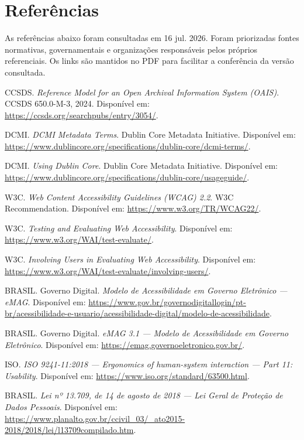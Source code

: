 \documentclass[11pt,a4paper]{article}
\begin{document}
\clearpage
\section*{Referências}

As referências abaixo foram consultadas em 16 jul. 2026. Foram priorizadas fontes normativas, governamentais e organizações responsáveis pelos próprios referenciais. Os links são mantidos no PDF para facilitar a conferência da versão consultada.

\begin{enumerate}[label={\textbf{[\arabic*]}}]
  \item CCSDS. \textit{Reference Model for an Open Archival Information System (OAIS)}. CCSDS 650.0-M-3, 2024. Disponível em: \url{https://ccsds.org/searchpubs/entry/3054/}.
  \item DCMI. \textit{DCMI Metadata Terms}. Dublin Core Metadata Initiative. Disponível em: \url{https://www.dublincore.org/specifications/dublin-core/dcmi-terms/}.
  \item DCMI. \textit{Using Dublin Core}. Dublin Core Metadata Initiative. Disponível em: \url{https://www.dublincore.org/specifications/dublin-core/usageguide/}.
  \item W3C. \textit{Web Content Accessibility Guidelines (WCAG) 2.2}. W3C Recommendation. Disponível em: \url{https://www.w3.org/TR/WCAG22/}.
  \item W3C. \textit{Testing and Evaluating Web Accessibility}. Disponível em: \url{https://www.w3.org/WAI/test-evaluate/}.
  \item W3C. \textit{Involving Users in Evaluating Web Accessibility}. Disponível em: \url{https://www.w3.org/WAI/test-evaluate/involving-users/}.
  \item BRASIL. Governo Digital. \textit{Modelo de Acessibilidade em Governo Eletrônico — eMAG}. Disponível em: \url{https://www.gov.br/governodigitallogin/pt-br/acessibilidade-e-usuario/acessibilidade-digital/modelo-de-acessibilidade}.
  \item BRASIL. Governo Digital. \textit{eMAG 3.1 — Modelo de Acessibilidade em Governo Eletrônico}. Disponível em: \url{https://emag.governoeletronico.gov.br/}.
  \item ISO. \textit{ISO 9241-11:2018 — Ergonomics of human-system interaction — Part 11: Usability}. Disponível em: \url{https://www.iso.org/standard/63500.html}.
  \item BRASIL. \textit{Lei nº 13.709, de 14 de agosto de 2018 — Lei Geral de Proteção de Dados Pessoais}. Disponível em: \url{https://www.planalto.gov.br/ccivil_03/_ato2015-2018/2018/lei/l13709compilado.htm}.

\end{enumerate}
\end{document}
